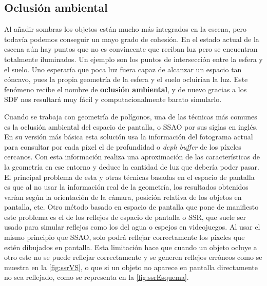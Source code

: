 \subsection{Oclusión ambiental}
Al añadir sombras los objetos están mucho más integrados en la escena, pero todavía podemos conseguir un mayo grado de cohesión. En el estado actual de la escena aún hay puntos que no es convincente que reciban luz pero se encuentran totalmente iluminados. Un ejemplo son los puntos de intersección entre la esfera y el suelo. Uno esperaría que poca luz fuera capaz de alcanzar un espacio tan cóncavo, pues la propia geometría de la esfera y el suelo ocluirían la luz. Este fenómeno recibe el nombre de \textbf{oclusión ambiental}, y de nuevo gracias a los SDF nos resultará muy fácil y computacionalmente barato simularlo.\newline

Cuando se trabaja con geometría de polígonos, una de las técnicas más comunes es la oclusión ambiental del espacio de pantalla, o SSAO por sus siglas en inglés. En su versión más básica esta solución usa la información del fotograma actual para consultar por cada píxel el  de profundidad o \textit{deph buffer} de los píxeles cercanos. Con esta información realiza una aproximación de las características de la geometría en ese entorno y deduce la cantidad de luz que debería poder pasar. El principal problema de esta y otras técnicas basadas en el espacio de pantalla es que al no usar la información real de la geometría, los resultados obtenidos varían según la orientación de la cámara, posición relativa de los objetos en pantalla, etc. Otro método basado en espacio de pantalla que pone de manifiesto este problema es el de los reflejos de espacio de pantalla o SSR, que suele ser usado para simular reflejos como los del agua o espejos en videojuegos. Al usar el mismo principio que SSAO, solo podrá reflejar correctamente los píxeles que estén dibujados en pantalla. Esta limitación hace que cuando un objeto ocluye a otro este no se puede reflejar correctamente y se generen reflejos erróneos como se muestra en la \autoref{fig:ssrVS}, o que si un objeto no aparece en pantalla directamente no sea reflejado, como se representa en la \autoref{fig:ssrEsquema}.

